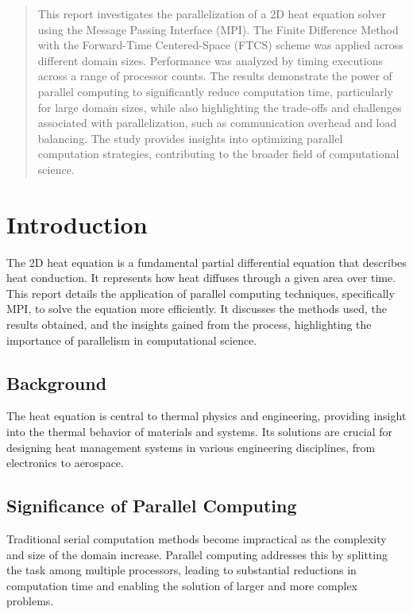 \documentclass[11pt]{article}
\begin{document}
    
    \maketitle
    \thispagestyle{empty}
    \newpage

    \begin{abstract}
        This report investigates the parallelization of a 2D heat equation solver using the Message Passing Interface (MPI). The Finite Difference Method with the Forward-Time Centered-Space (FTCS) scheme was applied across different domain sizes. Performance was analyzed by timing executions across a range of processor counts. The results demonstrate the power of parallel computing to significantly reduce computation time, particularly for large domain sizes, while also highlighting the trade-offs and challenges associated with parallelization, such as communication overhead and load balancing. The study provides insights into optimizing parallel computation strategies, contributing to the broader field of computational science.
    \end{abstract}

    \tableofcontents
    
    \newpage
    
    \section{Introduction}
        The 2D heat equation is a fundamental partial differential equation that describes heat conduction. It represents how heat diffuses through a given area over time. This report details the application of parallel computing techniques, specifically MPI, to solve the equation more efficiently. It discusses the methods used, the results obtained, and the insights gained from the process, highlighting the importance of parallelism in computational science.

        \subsection{Background}
        The heat equation is central to thermal physics and engineering, providing insight into the thermal behavior of materials and systems. Its solutions are crucial for designing heat management systems in various engineering disciplines, from electronics to aerospace.

        \subsection{Significance of Parallel Computing}
        Traditional serial computation methods become impractical as the complexity and size of the domain increase. Parallel computing addresses this by splitting the task among multiple processors, leading to substantial reductions in computation time and enabling the solution of larger and more complex problems.
\end{document}
